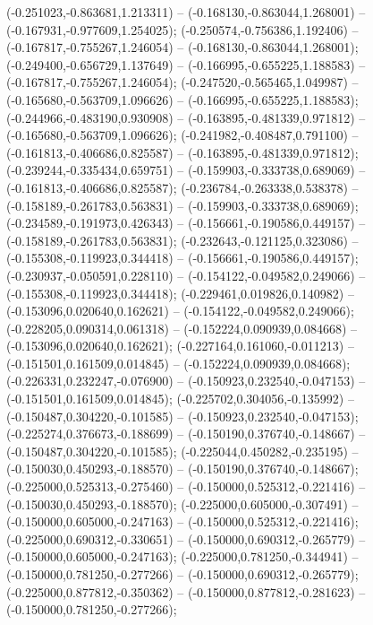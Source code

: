  (-0.251023,-0.863681,1.213311) -- (-0.168130,-0.863044,1.268001) -- (-0.167931,-0.977609,1.254025);
 (-0.250574,-0.756386,1.192406) -- (-0.167817,-0.755267,1.246054) -- (-0.168130,-0.863044,1.268001);
 (-0.249400,-0.656729,1.137649) -- (-0.166995,-0.655225,1.188583) -- (-0.167817,-0.755267,1.246054);
 (-0.247520,-0.565465,1.049987) -- (-0.165680,-0.563709,1.096626) -- (-0.166995,-0.655225,1.188583);
 (-0.244966,-0.483190,0.930908) -- (-0.163895,-0.481339,0.971812) -- (-0.165680,-0.563709,1.096626);
 (-0.241982,-0.408487,0.791100) -- (-0.161813,-0.406686,0.825587) -- (-0.163895,-0.481339,0.971812);
 (-0.239244,-0.335434,0.659751) -- (-0.159903,-0.333738,0.689069) -- (-0.161813,-0.406686,0.825587);
 (-0.236784,-0.263338,0.538378) -- (-0.158189,-0.261783,0.563831) -- (-0.159903,-0.333738,0.689069);
 (-0.234589,-0.191973,0.426343) -- (-0.156661,-0.190586,0.449157) -- (-0.158189,-0.261783,0.563831);
 (-0.232643,-0.121125,0.323086) -- (-0.155308,-0.119923,0.344418) -- (-0.156661,-0.190586,0.449157);
 (-0.230937,-0.050591,0.228110) -- (-0.154122,-0.049582,0.249066) -- (-0.155308,-0.119923,0.344418);
 (-0.229461,0.019826,0.140982) -- (-0.153096,0.020640,0.162621) -- (-0.154122,-0.049582,0.249066);
 (-0.228205,0.090314,0.061318) -- (-0.152224,0.090939,0.084668) -- (-0.153096,0.020640,0.162621);
 (-0.227164,0.161060,-0.011213) -- (-0.151501,0.161509,0.014845) -- (-0.152224,0.090939,0.084668);
 (-0.226331,0.232247,-0.076900) -- (-0.150923,0.232540,-0.047153) -- (-0.151501,0.161509,0.014845);
 (-0.225702,0.304056,-0.135992) -- (-0.150487,0.304220,-0.101585) -- (-0.150923,0.232540,-0.047153);
 (-0.225274,0.376673,-0.188699) -- (-0.150190,0.376740,-0.148667) -- (-0.150487,0.304220,-0.101585);
 (-0.225044,0.450282,-0.235195) -- (-0.150030,0.450293,-0.188570) -- (-0.150190,0.376740,-0.148667);
 (-0.225000,0.525313,-0.275460) -- (-0.150000,0.525312,-0.221416) -- (-0.150030,0.450293,-0.188570);
 (-0.225000,0.605000,-0.307491) -- (-0.150000,0.605000,-0.247163) -- (-0.150000,0.525312,-0.221416);
 (-0.225000,0.690312,-0.330651) -- (-0.150000,0.690312,-0.265779) -- (-0.150000,0.605000,-0.247163);
 (-0.225000,0.781250,-0.344941) -- (-0.150000,0.781250,-0.277266) -- (-0.150000,0.690312,-0.265779);
 (-0.225000,0.877812,-0.350362) -- (-0.150000,0.877812,-0.281623) -- (-0.150000,0.781250,-0.277266);
